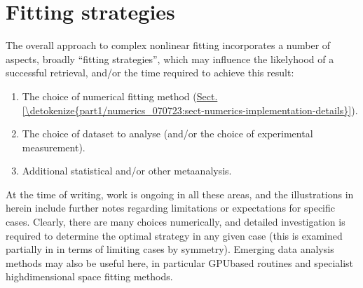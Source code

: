 \documentclass[letterpaper,table,10pt,english]{jupyterBook}
\begin{document}
\section{Fitting strategies}
\label{\detokenize{part1/numerics_070723:fitting-strategies}}\label{\detokenize{part1/numerics_070723:sect-numerics-fitting-strategies}}
\sphinxAtStartPar
The overall approach to complex non\sphinxhyphen{}linear fitting incorporates a number of aspects, broadly “fitting strategies”, which may influence the likelyhood of a successful {\hyperref[\detokenize{backmatter/glossary:term-radial-matrix-elements}]{}} retrieval, and/or the time required to achieve this result:
\begin{enumerate}
%
\item {} 
\sphinxAtStartPar
The choice of numerical fitting method (\hyperref[\detokenize{part1/numerics_070723:sect-numerics-implementation-details}]{Sect.\@ \ref{\detokenize{part1/numerics_070723:sect-numerics-implementation-details}}}).

\item {} 
\sphinxAtStartPar
The choice of dataset to analyse (and/or the choice of experimental measurement).

\item {} 
\sphinxAtStartPar
Additional statistical and/or other meta\sphinxhyphen{}analysis.

\end{enumerate}

\sphinxAtStartPar
At the time of writing, work is ongoing in all these areas, and the illustrations in {\hyperref[\detokenize{part2/extracting_matrix_elements_overview_270423:chpt-extracting-matrix-elements-overview}]{}} herein include further notes regarding limitations or expectations for specific cases. Clearly, there are many choices numerically, and detailed investigation is required to determine the optimal strategy in any given case (this is examined partially in {\hyperref[\detokenize{part2/extracting_matrix_elements_overview_270423:chpt-extracting-matrix-elements-overview}]{}} in terms of limiting cases by symmetry). Emerging data analysis methods may also be useful here, in particular GPU\sphinxhyphen{}based routines and specialist high\sphinxhyphen{}dimensional space fitting methods.
\end{document}
